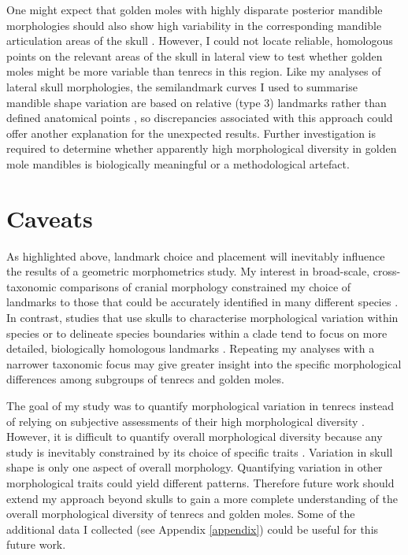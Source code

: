 	One might expect that golden moles with highly disparate posterior mandible morphologies should also show high variability in the corresponding mandible articulation areas of the skull \citep[although developmental genetics studies have revealed that mandibles can also develop shape variation independently of skulls; ][] {Rot-Nikcevic2007}. However, I could not locate reliable, homologous points on the relevant areas of the skull in lateral view to test whether golden moles might be more variable than tenrecs in this region. Like my analyses of lateral skull morphologies, the semilandmark curves I used to summarise mandible shape variation are based on relative (type 3) landmarks rather than defined anatomical points \citep{Zelditch2012}, so discrepancies associated with this approach could offer another explanation for the unexpected results. Further investigation is required to determine whether apparently high morphological diversity in golden mole mandibles is biologically meaningful or a methodological artefact. 

		
\section{Caveats}
\label{sect:caveats}

	As highlighted above, landmark choice and placement will inevitably influence the results of a geometric morphometrics study. My interest in broad-scale, cross-taxonomic comparisons of cranial morphology constrained my choice of landmarks to those that could be accurately identified in many different species \citep[e.g.][]{Ruta2013, Goswami2011, Wroe2007}. In contrast, studies that use skulls to characterise morphological variation within species \citep[e.g.][]{Blagojevic2011, Bornholdt2008} or to delineate species boundaries within a clade \citep[e.g.][]{Panchetti2008} tend to focus on more detailed, biologically homologous landmarks \citep{Zelditch2012}. Repeating my analyses with a narrower taxonomic focus may give greater insight into the specific morphological differences among subgroups of tenrecs and golden moles.
	
	The goal of my study was to quantify morphological variation in tenrecs instead of relying on subjective assessments of their high morphological diversity \citep{Olson2013, Soarimalala2011, Eisenberg1969}. However, it is difficult to quantify overall morphological diversity because any study is inevitably constrained by its choice of specific traits \citep{Roy1997}. Variation in skull shape is only one aspect of overall morphology. Quantifying variation in other morphological traits could yield different patterns. Therefore future work should extend my approach beyond skulls to gain a more complete understanding of the overall morphological diversity of tenrecs and golden moles. Some of the additional data I collected (see Appendix \ref{appendix}) could be useful for this future work.

